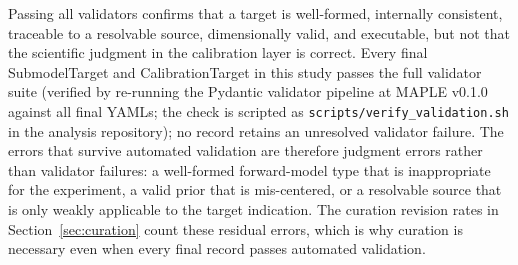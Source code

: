 Passing all validators confirms that a target is well-formed, internally consistent, traceable to a resolvable source, dimensionally valid, and executable, but not that the scientific judgment in the calibration layer is correct. Every final SubmodelTarget and CalibrationTarget in this study passes the full validator suite (verified by re-running the Pydantic validator pipeline at MAPLE v0.1.0 against all final YAMLs; the check is scripted as \texttt{scripts/verify\_validation.sh} in the analysis repository); no record retains an unresolved validator failure. The errors that survive automated validation are therefore judgment errors rather than validator failures: a well-formed forward-model type that is inappropriate for the experiment, a valid prior that is mis-centered, or a resolvable source that is only weakly applicable to the target indication. The curation revision rates in Section~\ref{sec:curation} count these residual errors, which is why curation is necessary even when every final record passes automated validation.
